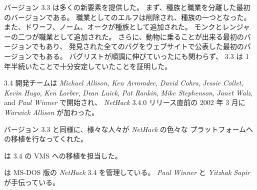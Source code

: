 \medskip
バージョン 3.3 は多くの新要素を提供した。
まず、種族と職業を分離した最初のバージョンである。
職業としてのエルフは削除され、種族の一つとなった。
また、ドワーフ、ノーム、オークが種族として追加された。
モンクとレンジャーの二つが職業として追加された。
さらに、動物に乗ることが出来る最初のバージョンでもあり、
発見された全てのバグをウェブサイトで公表した最初のバージョンでもある。
バグリストが順調に伸びていったにも関わらず、
3.3 は 1 年半続いたことで十分安定していたことを証明した。

\medskip
3.4 開発チームは {\it Michael Allison}, {\it Ken Arromdee},
{\it David Cohrs}, {\it Jessie Collet}, {\it Kevin Hugo}, {\it Ken Lorber},
{\it Dean Luick}, {\it Pat Rankin}, {\it Mike Stephenson},
{\it Janet Walz}, and {\it Paul Winner} で開始され、
{\it NetHack\/} 3.4.0 リリース直前の 2002 年 3 月に
{\it Warwick Allison} が加わった。

\medskip
バージョン 3.3 と同様に、様々な人々が {\it NetHack\/} の色々な
プラットフォームへの移植を行なってくれた。

\medskip
 は 3.4 の VMS への移植を担当した。

\medskip
 は MS-DOS 版の {\it NetHack\/} 3.4 を管理している。
{\it Paul Winner} と {\it Yitzhak Sapir} が手伝っている。

